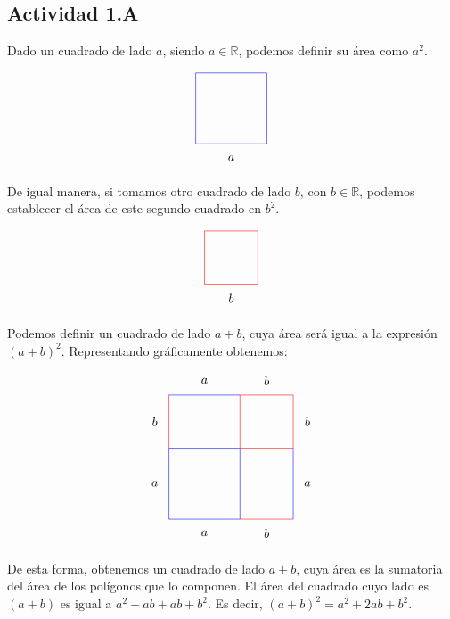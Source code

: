 \subsection*{Actividad 1.A}

Dado un cuadrado de lado $a$, siendo $a \in \mathbb{R}$, podemos definir su área como $a^2$.

\begin{align*}
\begin{tikzpicture}
\draw[blue] (0,0) rectangle (2,2);
\draw (1, -0.4) node{$a$};
\end{tikzpicture}
\end{align*}

De igual manera, si tomamos otro cuadrado de lado $b$, con $b \in \mathbb{R}$, podemos establecer el área de este segundo cuadrado en $b^2$. 

\begin{align*}
\begin{tikzpicture}
\draw[red] (0,0) rectangle (1.5,1.5);
\draw (.75, -0.4) node{$b$};
\end{tikzpicture}
\end{align*}

Podemos definir un cuadrado de lado $a+b$, cuya área será igual a la expresión $(a+b)^2$. Representando gráficamente obtenemos:

\begin{align*}
\begin{tikzpicture}
\draw[blue] (0,0) rectangle (2,2);
\draw (1, -0.4) node{$a$};
\draw[red] (2,2) rectangle (3.5,3.5);
\draw (3.9, 2.75) node{$b$};
\draw[red] (2,0) -- (3.5,0);
\draw (2.75, -0.4) node{$b$};
\draw[blue] (3.5, 0) -- (3.5, 2);
\draw (3.9, 1) node{$a$};
\draw[blue] (0, 3.5) -- (2, 3.5);
\draw (1, 3.9) node{$a$};
\draw[red] (0, 2) -- (0, 3.5);
\draw (-0.4, 2.75) node{$b$};
\draw (2.75, 3.9) node{$b$};
\draw (-0.4, 1) node{$a$};
\end{tikzpicture}
\end{align*}

De esta forma, obtenemos un cuadrado de lado $a+b$, cuya área es la sumatoria del área de los polígonos que lo componen. El área del cuadrado cuyo lado es $(a+b)$ es igual a $a^2 + ab + ab + b^2$. Es decir, $(a + b)^2 = a^2 + 2ab + b^2$.
